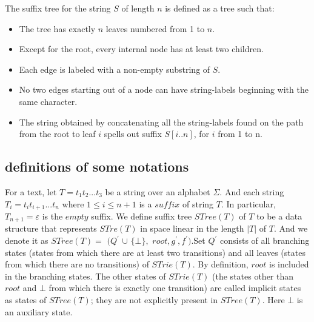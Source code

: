 \documentclass[paper=a4, fontsize=11pt]{scrartcl} %
\numberwithin{equation}{section} %
\numberwithin{figure}{section} %
\numberwithin{table}{section} %
\begin{document}
The suffix tree for the string $S$ of length $n$ is defined as a tree such that:
\begin{itemize}
  \item The tree has exactly $n$ leaves numbered from 1 to $n$.
  \item Except for the root, every internal node has at least two children.
  \item Each edge is labeled with a non-empty substring of $S$.
  \item No two edges starting out of a node can have string-labels beginning with the same character.
  \item  The string obtained by concatenating all the string-labels found on the path from the root to leaf $i$ spells out suffix $S[i..n]$, for $i$ from 1 to n.
\end{itemize}

\subsection{definitions of some notations}
For a text, let $T = t_1t_2...t_3$ be a string over an alphabet $\Sigma$. And each string $T_i = t_it_{i+1}...t_n$ where $1 \leq i \leq n+1$ is a $suffix$ of string $T$. In particular, $T_{n+1} = \varepsilon$ is the $empty$ suffix. We define suffix tree $STree(T)$ of $T$ to be a data structure that represents $STre(T)$ in space linear in the length $|T|$ of $T$. And we denote it as $STree(T) =$
$(Q^{'}$ 
$\cup$
$\{\bot\},$
$root, g^{'}, f^{'})$.Set $Q^{'}$ consists of all branching states (states from which there
are at least two transitions) and all leaves (states from which there are no transitions) of $STrie(T)$. By definition, $root$ is included in the branching states.
The other states of $STrie(T)$ (the states other than $root$ and $\bot$ from which
there is exactly one transition) are called implicit states as states of $STree(T)$; they
are not explicitly present in $STree(T)$. Here $\bot$ is an auxiliary state.


\nocite{*}
\end{document}
